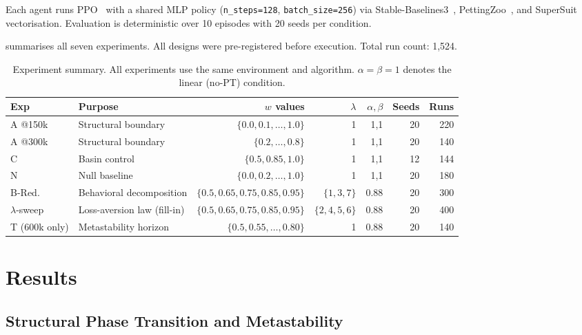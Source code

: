 \documentclass[11pt]{article}
\begin{document}
Each agent runs PPO~\citep{schulman2017ppo} with a shared MLP policy
(\texttt{n\_steps=128}, \texttt{batch\_size=256}) via
Stable-Baselines3~\citep{raffin2021sb3}, PettingZoo~\citep{terry2021pettingzoo},
and SuperSuit~\citep{terry2020supersuit} vectorisation.
Evaluation is deterministic over 10 episodes with 20 seeds per condition.

 summarises all seven experiments.
All designs were pre-registered before execution.
Total run count: 1,524.

\begin{table}[t]
\centering
\caption{Experiment summary. All experiments use the same environment and
algorithm.  $\alpha{=}\beta{=}1$ denotes the linear (no-PT) condition.}
\label{tab:experiments}
\small
\begin{tabular}{llrrrrr}
\toprule
Exp & Purpose & $w$ values & $\lambda$ & $\alpha,\beta$ & Seeds & Runs \\
\midrule
A @150k  & Structural boundary  & $\{0.0, 0.1,\ldots, 1.0\}$ & 1 & 1,1 & 20 & 220 \\
A @300k  & Structural boundary  & $\{0.2,\ldots, 0.8\}$       & 1 & 1,1 & 20 & 140 \\
C        & Basin control        & $\{0.5, 0.85, 1.0\}$        & 1 & 1,1 & 12 & 144 \\
N        & Null baseline        & $\{0.0, 0.2,\ldots, 1.0\}$  & 1 & 1,1 & 20 & 180 \\
B-Red.   & Behavioral decomposition & $\{0.5, 0.65, 0.75, 0.85, 0.95\}$ & $\{1,3,7\}$ & 0.88 & 20 & 300 \\
$\lambda$-sweep & Loss-aversion law (fill-in) & $\{0.5, 0.65, 0.75, 0.85, 0.95\}$ & $\{2,4,5,6\}$ & 0.88 & 20 & 400 \\
T (600k only) & Metastability horizon & $\{0.5, 0.55,\ldots, 0.80\}$ & 1 & 0.88 & 20 & 140 \\
\bottomrule
\end{tabular}
\end{table}

\section{Results}
\label{sec:results}

\subsection{Structural Phase Transition and Metastability}
\label{sec:results_structural}
\end{document}

